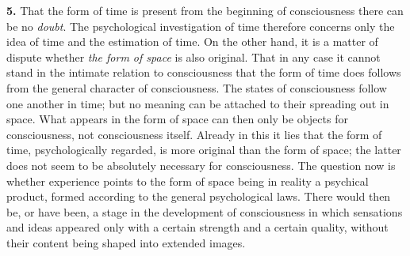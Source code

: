 \documentclass[12pt,a4paper]{book}
\newcommand{\opage}[1]{\marginnote{\footnotesize\textit{[#1]}}}
\begin{document}
\textbf{5.} That the form of time is present from the beginning of
consciousness there can be no \emph{doubt}. The psychological
investigation of time therefore concerns only the idea of time and the
estimation of time. On the other hand, it is a matter of dispute whether
\emph{the form of space} is also original. That in any
\opage{235}case it cannot stand in the intimate relation to consciousness
that the form of time does follows from the general character of
consciousness. The states of consciousness follow one another in time;
but no meaning can be attached to their spreading out in space. What
appears in the form of space can then only be objects for consciousness,
not consciousness itself. Already in this it lies that the form of time,
psychologically regarded, is more original than the form of space; the
latter does not seem to be absolutely necessary for consciousness. The
question now is whether experience points to the form of space being in
reality a psychical product, formed according to the general
psychological laws. There would then be, or have been, a stage in the
development of consciousness in which sensations and ideas appeared only
with a certain strength and a certain quality, without their content
being shaped into extended images.
\end{document}
